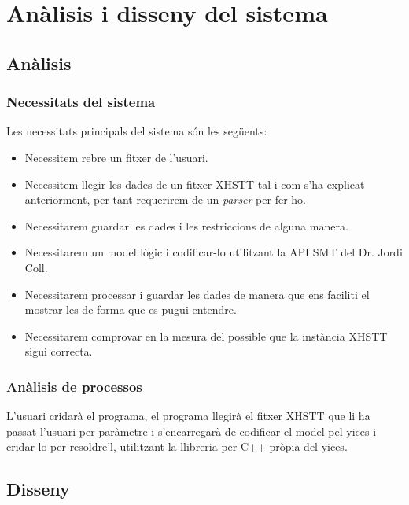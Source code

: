 \documentclass[11pt,a4paper,twoside]{report}
\begin{document}
  \chapter{Anàlisis i disseny del sistema}

  \section{Anàlisis}
  \subsection{Necessitats del sistema}
  Les necessitats principals del sistema són les següents: 
  \begin{itemize}
    \item Necessitem rebre un fitxer de l'usuari.
    \item Necessitem llegir les dades de un fitxer XHSTT tal i com s'ha explicat anteriorment, per tant requerirem de un \textit{parser} per fer-ho.
    \item Necessitarem guardar les dades i les restriccions de alguna manera.
    \item Necessitarem un model lògic i codificar-lo utilitzant la API SMT del Dr. Jordi Coll. 
    \item Necessitarem processar i guardar les dades de manera que ens faciliti el mostrar-les de forma que es pugui entendre.
    \item Necessitarem comprovar en la mesura del possible que la instància XHSTT sigui correcta.
  \end{itemize}

  \subsection{Anàlisis de processos}
  L'usuari cridarà el programa, el programa llegirà el fitxer XHSTT que li ha passat l'usuari per paràmetre i s'encarregarà de codificar el model pel yices i cridar-lo per resoldre'l, utilitzant la llibreria per C++ pròpia del yices.


  
  \section{Disseny}    
\end{document}
